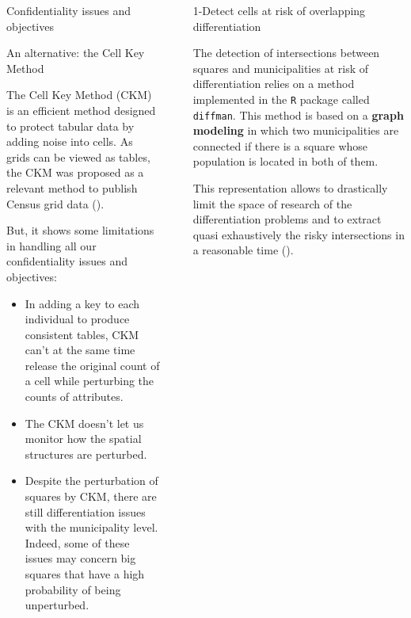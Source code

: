 \documentclass[final,xcolor={dvipsnames,svgnames,table}]{beamer}
\newlength{\sepwidth}
\newlength{\colwidth}
\newcommand{\separatorcolumn}{\begin{column}{\sepwidth}\end{column}}
\begin{document}
\begin{frame}[fragile,t]
\begin{columns}[t]
\begin{column}{\colwidth}
\begin{backblock}{Confidentiality issues and objectives}
 

  \end{backblock}

  \begin{block}{An alternative: the Cell Key Method}

    The Cell Key Method (CKM) is an efficient method designed to protect tabular data by adding noise into cells. As grids can be viewed as tables, the CKM was proposed as a relevant method to publish Census grid data (\cite{censusmeth}). 
    
    But, it shows some limitations in handling all our confidentiality issues and objectives:
    
    \begin{itemize}
        \item In adding a key to each individual to produce consistent tables, CKM can't at the same time release the original count of a cell while perturbing the counts of attributes.
        \item The CKM doesn't let us monitor how the spatial structures are perturbed.
        \item Despite the perturbation of squares by CKM, there are still differentiation issues with the municipality level. Indeed, some of these issues may concern big squares that have a high probability of being unperturbed.
    \end{itemize}

  \end{block}

\end{column}

\separatorcolumn

\begin{column}{\colwidth}
  \vspace{-1cm}
  \begin{block}{1-Detect cells at risk of overlapping differentiation}

The detection of intersections between squares and municipalities at risk of differentiation relies on a method implemented in the \texttt{R} package called \texttt{diffman}. This method is based on a \textbf{graph modeling} in which two municipalities are connected if there is a square whose population is located in both of them. 

This representation allows to drastically limit the space of research of the differentiation problems and to extract quasi exhaustively the risky intersections in a reasonable time (\cite{costemalle2019}).


\end{block}
\end{column}
\end{columns}
\end{frame}
\end{document}
